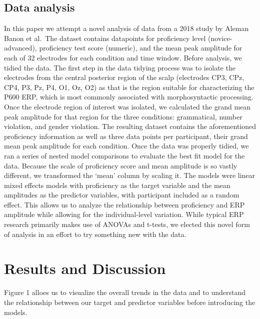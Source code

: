 \documentclass[
  man,floatsintext]{apa6}
\begin{document}
\subsection{Data analysis}\label{data-analysis}

In this paper we attempt a novel analysis of data from a 2018 study by Aleman Banon et al.~The dataset contains datapoints for proficiency level (novice-advanced), proficiency test score (numeric), and the mean peak amplitude for each of 32 electrodes for each condition and time window. Before analysis, we tidied the data. The first step in the data tidying process was to isolate the electrodes from the central posterior region of the scalp (electrodes CP3, CPz, CP4, P3, Pz, P4, O1, Oz, O2) as that is the region suitable for characterizing the P600 ERP, which is most commonly associated with morphosyntactic processing. Once the electrode region of interest was isolated, we calculated the grand mean peak amplitude for that region for the three conditions: grammatical, number violation, and gender violation. The resulting dataset contains the aforementioned proficiency information as well as three data points per participant, their grand mean peak amplitude for each condition.
Once the data was properly tidied, we ran a series of nested model comparisons to evaluate the best fit model for the data. Because the scale of proficiency score and mean amplitude is so vastly different, we transformed the `mean' column by scaling it. The models were linear mixed effects models with proficiency as the target variable and the mean amplitudes as the predictor variables, with participant included as a random effect. This allows us to analyze the relationship between proficiency and ERP amplitude while allowing for the individual-level variation. While typical ERP research primarily makes use of ANOVAs and t-tests, we elected this novel form of analysis in an effort to try something new with the data.

\section{Results and Discussion}\label{results-and-discussion}

Figure 1 alloes us to visualize the overall trends in the data and to understand the relationship between our target and predictor variables before introducing the models.
\end{document}
